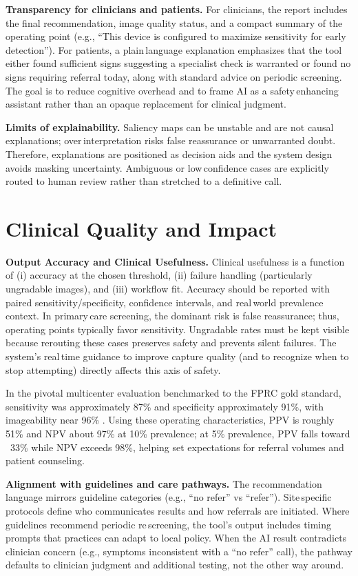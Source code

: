 \documentclass[sigplan,screen]{acmart}
\begin{document}
\textbf{Transparency for clinicians and patients.} For clinicians, the report includes the final recommendation, image quality status, and a compact summary of the operating point (e.g., “This device is configured to maximize sensitivity for early detection”). For patients, a plain\,language explanation emphasizes that the tool either found sufficient signs suggesting a specialist check is warranted or found no signs requiring referral today, along with standard advice on periodic screening. The goal is to reduce cognitive overhead and to frame AI as a safety\,enhancing assistant rather than an opaque replacement for clinical judgment.

\textbf{Limits of explainability.} Saliency maps can be unstable and are not causal explanations; over\,interpretation risks false reassurance or unwarranted doubt. Therefore, explanations are positioned as decision aids and the system design avoids masking uncertainty. Ambiguous or low\,confidence cases are explicitly routed to human review rather than stretched to a definitive call.

\section{Clinical Quality and Impact}
\textbf{Output Accuracy and Clinical Usefulness.} Clinical usefulness is a function of (i) accuracy at the chosen threshold, (ii) failure handling (particularly ungradable images), and (iii) workflow fit. Accuracy should be reported with paired sensitivity/specificity, confidence intervals, and real\,world prevalence context. In primary\,care screening, the dominant risk is false reassurance; thus, operating points typically favor sensitivity. Ungradable rates must be kept visible because rerouting these cases preserves safety and prevents silent failures. The system’s real\,time guidance to improve capture quality (and to recognize when to stop attempting) directly affects this axis of safety\cite{abramoff2018pivotal}.

In the pivotal multicenter evaluation benchmarked to the FPRC gold standard, sensitivity was approximately 87\% and specificity approximately 91\%, with imageability near 96\% \cite{abramoff2018pivotal}. Using these operating characteristics, PPV is roughly 51\% and NPV about 97\% at 10\% prevalence; at 5\% prevalence, PPV falls toward ~33\% while NPV exceeds 98\%, helping set expectations for referral volumes and patient counseling.

\textbf{Alignment with guidelines and care pathways.} The recommendation language mirrors guideline categories (e.g., “no refer” vs “refer”). Site\,specific protocols define who communicates results and how referrals are initiated. Where guidelines recommend periodic re\,screening, the tool’s output includes timing prompts that practices can adapt to local policy. When the AI result contradicts clinician concern (e.g., symptoms inconsistent with a “no refer” call), the pathway defaults to clinician judgment and additional testing, not the other way around\cite{fda2018denovo_summary}.
\end{document}
